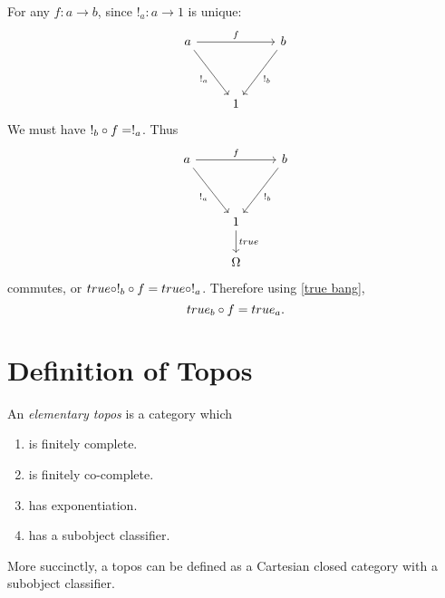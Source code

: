     \begin{exercise}
        For any $f : a \to b$, since $!_a : a \to 1$ is unique:
        \[\begin{tikzcd}
            {a} && {b} \\
            \\
            & {1}
            \arrow["{!_b}", from=1-3, to=3-2]
            \arrow["{f}", from=1-1, to=1-3]
            \arrow["{!_a}"', from=1-1, to=3-2]
        \end{tikzcd}\]
        We must have $!_b \circ f = !_a$. Thus
        \[\begin{tikzcd}
            {a} && {b} \\
            \\
            & {1} \\
            & {\Omega}
            \arrow["{!_b}", from=1-3, to=3-2]
            \arrow["{f}", from=1-1, to=1-3]
            \arrow["{!_a}"', from=1-1, to=3-2]
            \arrow["{true}", from=3-2, to=4-2]
        \end{tikzcd}\]
        commutes, or  $true \circ !_b \circ f = true \circ !_a$. Therefore using \cref{true bang},
        $$true_b \circ f = true_a.$$
    \end{exercise}

\section{Definition of Topos}
    \begin{defi}
        An \emph{elementary topos} is a category which
        \begin{enumerate}
            \item is finitely complete.
            \item is finitely co-complete.
            \item has exponentiation.
            \item has a subobject classifier.
        \end{enumerate}
    \end{defi}

    \begin{fact}
        More succinctly, a topos can be defined as a Cartesian closed category with a subobject classifier.
    \end{fact}

